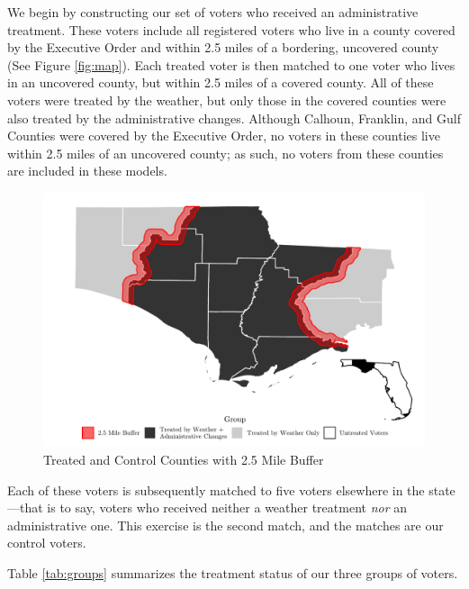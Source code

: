 \documentclass[
  12pt,
]{article}
\begin{document}
We begin by constructing our set of voters who received an administrative treatment. These voters include all registered voters who live in a county covered by the Executive Order and within 2.5 miles of a bordering, uncovered county (See Figure \ref{fig:map}). Each treated voter is then matched to one voter who lives in an uncovered county, but within 2.5 miles of a covered county. All of these voters were treated by the weather, but only those in the covered counties were also treated by the administrative changes. Although Calhoun, Franklin, and Gulf Counties were covered by the Executive Order, no voters in these counties live within 2.5 miles of an uncovered county; as such, no voters from these counties are included in these models.

\begin{figure}[h]

{\centering \includegraphics{hurricane_michael_files/figure-latex/map-chunk-1} 

}

\caption{\label{fig:map}Treated and Control Counties with 2.5 Mile Buffer}\label{fig:map-chunk}
\end{figure}

Each of these voters is subsequently matched to five voters elsewhere in the state---that is to say, voters who received neither a weather treatment \emph{nor} an administrative one. This exercise is the second match, and the matches are our control voters.

Table \ref{tab:groups} summarizes the treatment status of our three groups of voters.
\end{document}

